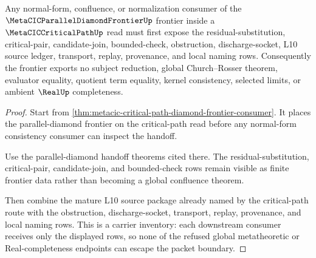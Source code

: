 \begin{theorem}
\label{thm:metacic-critical-path-frontier-consumer-nonescape}
Any normal-form, confluence, or normalization consumer of the $\MetaCICParallelDiamondFrontierUp$ frontier inside a $\MetaCICCriticalPathUp$ read must first expose the residual-substitution, critical-pair, candidate-join, bounded-check, obstruction, discharge-socket, L10 source ledger, transport, replay, provenance, and local naming rows. Consequently the frontier exports no subject reduction, global Church--Rosser theorem, evaluator equality, quotient term equality, kernel consistency, selected limits, or ambient $\RealUp$ completeness.
\end{theorem}
\begin{proof}
Start from \autoref{thm:metacic-critical-path-diamond-frontier-consumer}. It places the parallel-diamond frontier on the critical-path read before any normal-form consistency consumer can inspect the handoff.

Use the parallel-diamond handoff theorems cited there. The residual-substitution, critical-pair, candidate-join, and bounded-check rows remain visible as finite frontier data rather than becoming a global confluence theorem.

Then combine the mature L10 source package already named by the critical-path route with the obstruction, discharge-socket, transport, replay, provenance, and local naming rows. This is a carrier inventory: each downstream consumer receives only the displayed rows, so none of the refused global metatheoretic or Real-completeness endpoints can escape the packet boundary.
\end{proof}

